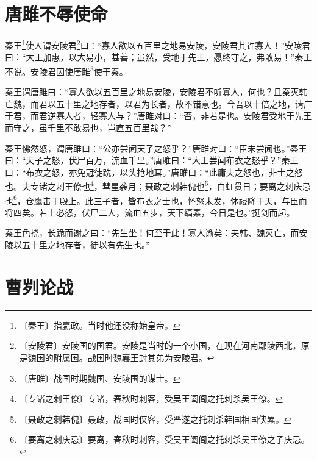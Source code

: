 \documentclass[12pt,UTF-8,openany]{ctexbook}
\begin{document}
\chapter{唐雎不辱使命}

\begin{normalsize}
    
    秦王\footnote{〔秦王〕指嬴政。当时他还没称始皇帝。}使人谓安陵君\footnote{〔安陵君〕安陵国的国君。安陵是当时的一个小国，在现在河南鄢陵西北，原是魏国的附属国。战国时魏襄王封其弟为安陵君。}曰：“寡人欲以五百里之地易安陵，安陵君其许寡人！”安陵君曰：“大王加惠，以大易小，甚善；虽然，受地于先王，愿终守之，弗敢易！”秦王不说。安陵君因使唐雎\footnote{〔唐雎〕战国时期魏国、安陵国的谋士。}使于秦。
    
    秦王谓唐雎曰：“寡人欲以五百里之地易安陵，安陵君不听寡人，何也？且秦灭韩亡魏，而君以五十里之地存者，以君为长者，故不错意也。今吾以十倍之地，请广于君，而君逆寡人者，轻寡人与？”唐雎对曰：“否，非若是也。安陵君受地于先王而守之，虽千里不敢易也，岂直五百里哉？”
    
    秦王怫然怒，谓唐雎曰：“公亦尝闻天子之怒乎？”唐雎对曰：“臣未尝闻也。”秦王曰：“天子之怒，伏尸百万，流血千里。”唐雎曰：“大王尝闻布衣之怒乎？”秦王曰：“布衣之怒，亦免冠徒跣，以头抢地耳。”唐雎曰：“此庸夫之怒也，非士之怒也。夫专诸之刺王僚也\footnote{〔专诸之刺王僚〕专诸，春秋时刺客，受吴王阖闾之托刺杀吴王僚。}，彗星袭月；聂政之刺韩傀也\footnote{〔聂政之刺韩傀〕聂政，战国时侠客，受严遂之托刺杀韩国相国侠累。}，白虹贯日；要离之刺庆忌也\footnote{〔要离之刺庆忌〕要离，春秋时刺客，受吴王阖闾之托刺杀吴王僚之子庆忌。}，仓鹰击于殿上。此三子者，皆布衣之士也，怀怒未发，休祲降于天，与臣而将四矣。若士必怒，伏尸二人，流血五步，天下缟素，今日是也。”挺剑而起。
    
    秦王色挠，长跪而谢之曰：“先生坐！何至于此！寡人谕矣：夫韩、魏灭亡，而安陵以五十里之地存者，徒以有先生也。”
\end{normalsize}



\chapter{曹刿论战}
\end{document}

